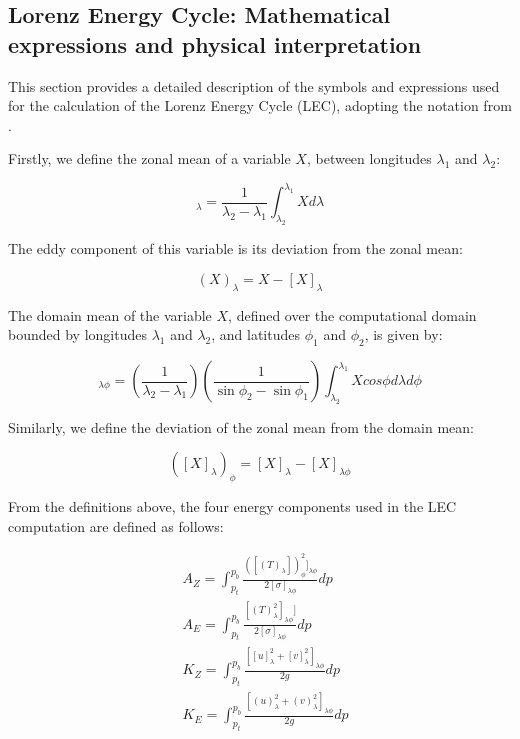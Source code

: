 \subsection{Lorenz Energy Cycle: Mathematical expressions and physical interpretation}\label{math}

This section provides a detailed description of the symbols and expressions used for the calculation of the Lorenz Energy Cycle (LEC), adopting the notation from \citet{michaelides1987limited}. 

Firstly, we define the zonal mean of a variable $X$, between longitudes $\lambda_{1}$ and $\lambda_{2}$:

 \begin{equation}
     [X]_\lambda = \frac{1}{\lambda_2 - \lambda_1} \int_{\lambda_2}^{\lambda_1} X d\lambda
 \end{equation}

The eddy component of this variable is its deviation from the zonal mean:

\begin{equation}
    (X)_\lambda =  X - [X]_\lambda
\end{equation}

The domain mean of the variable $X$, defined over the computational domain bounded by longitudes $\lambda_1$ and $\lambda_2$, and latitudes $\phi_1$ and $\phi_2$, is given by:

\begin{equation}
    [X]_{\lambda\phi} = \left(\frac{1}{\lambda_2 - \lambda_1}\right)  \left(\frac{1}{\sin\phi_2 - \sin\phi_1}\right) \int_{\lambda_2}^{\lambda_1} X cos\phi d\lambda d\phi 
\end{equation}

Similarly, we define the deviation of the zonal mean from the domain mean:

\begin{equation}
    ([X]_\lambda)_\phi = [X]_\lambda - [X]_{\lambda\phi}
\end{equation}

From the definitions above, the four energy components used in the LEC computation are defined as follows:

\begin{align}
   &A_Z = \int_{p_t}^{p_b} \frac{([(T)_\lambda ])_\phi^{2}]_{\lambda \phi}}  {2[\sigma]_{\lambda \phi}} dp \label{eq:AZ} \\
   &A_E = \int_{p_t}^{p_b} \frac{[(T)_\lambda^{2}]_{\lambda \phi}]}  {2[\sigma]_{\lambda \phi}} dp \label{eq:AE} \\
   &K_Z =  \int_{p_t}^{p_b} \frac{[[u]_\lambda^2 + [v]_\lambda^2]_{\lambda \phi}}{2g} dp \label{eq:KZ} \\
   &K_E =  \int_{p_t}^{p_b} \frac{[(u)_\lambda^2 + (v)_\lambda^2]_{\lambda \phi}}{2g} dp \label{eq:KE}
\end{align}

